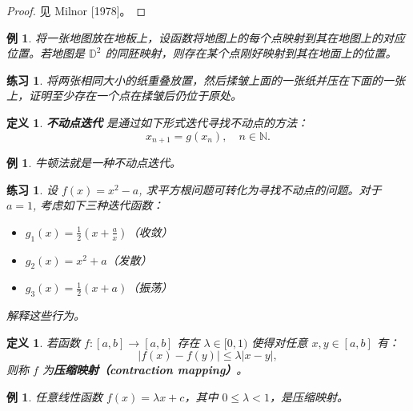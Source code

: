 \documentclass[a4paper]{ctexart}
\newtheorem{definition}[theorem]{定义} %
\newtheorem{example}[theorem]{例}
\newtheorem{exercise}[theorem]{练习}
\numberwithin{theorem}{section}
\numberwithin{equation}{section}
\numberwithin{figure}{section}
\numberwithin{remark}{section}
\begin{document}
\begin{proof}
见 Milnor [1978]。
\end{proof}

\begin{example}
将一张地图放在地板上，设函数将地图上的每个点映射到其在地图上的对应位置。若地图是 \( \mathbb{D}^2 \) 的同胚映射，则存在某个点刚好映射到其在地面上的位置。
\end{example}

\begin{exercise}
将两张相同大小的纸重叠放置，然后揉皱上面的一张纸并压在下面的一张上，证明至少存在一个点在揉皱后仍位于原处。
\end{exercise}

\begin{definition}
\textbf{不动点迭代} 是通过如下形式迭代寻找不动点的方法：
\begin{equation}
x_{n+1} = g(x_n), \quad n \in \mathbb{N}.
\end{equation}
\end{definition}

\begin{example}
牛顿法就是一种不动点迭代。
\end{example}

\begin{exercise}
    \label{exe::fixed_point_behavior}
设 \( f(x) = x^2 - a \), 求平方根问题可转化为寻找不动点的问题。对于 \( a = 1 \), 考虑如下三种迭代函数：
\begin{itemize}
    \item \( g_1(x) = \frac{1}{2}(x + \frac{a}{x}) \)（收敛）
    \item \( g_2(x) = x^2 + a \)（发散）
    \item \( g_3(x) = \frac{1}{2}(x + a) \)（振荡）
\end{itemize}
解释这些行为。
\end{exercise}

\begin{definition}
若函数 \( f : [a, b] \to [a, b] \) 存在 \( \lambda \in [0, 1) \) 使得对任意 \( x, y \in [a, b] \) 有：
\begin{equation}
|f(x) - f(y)| \leq \lambda |x - y|,
\end{equation}
则称 \( f \) 为\textbf{压缩映射（contraction mapping）}。
\end{definition}

\begin{example}
任意线性函数 \( f(x) = \lambda x + c \)，其中 \( 0 \leq \lambda < 1 \)，是压缩映射。
\end{example}
\end{document}
